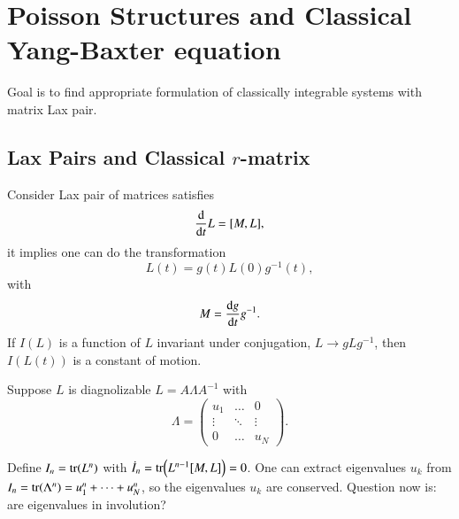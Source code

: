 \chapter{Poisson Structures and Classical Yang-Baxter equation}
Goal is to find appropriate formulation of classically integrable systems with matrix Lax pair.

\section{Lax Pairs and Classical $r$-matrix}
Consider Lax pair of matrices satisfies
\begin{equation*}
	\dv{t} L = \comm{M}{L},
\end{equation*}
it implies one can do the transformation
\begin{equation*}
	L(t) = g(t) L(0) g^{-1}(t),
\end{equation*}
with 
\begin{equation*}
	M = \dv{g}{t} g^{-1}.
\end{equation*}
If $I(L)$ is a function of $L$ invariant under conjugation, $L \rightarrow g L g^{-1}$, then $I(L(t))$ is a constant of motion.

Suppose $L$ is diagnolizable $L = A \Lambda A^{-1}$ with 
\begin{equation*}
	\Lambda = \begin{pmatrix} u_1 & \dots & 0 \\
		\vdots & \ddots & \vdots \\
	0 & \dots & u_N \end{pmatrix}.
\end{equation*}

Define $I_n = \tr(L^{n})$  with $\dot{I}_n = \tr(L^{n-1} \comm{M}{L}) = 0$. One can extract eigenvalues $u_k$ from $I_n = \tr(\Lambda^n) = u_1^n + \dots + u_N^n$, so the eigenvalues $u_k$ are conserved. Question now is: are eigenvalues in involution?

